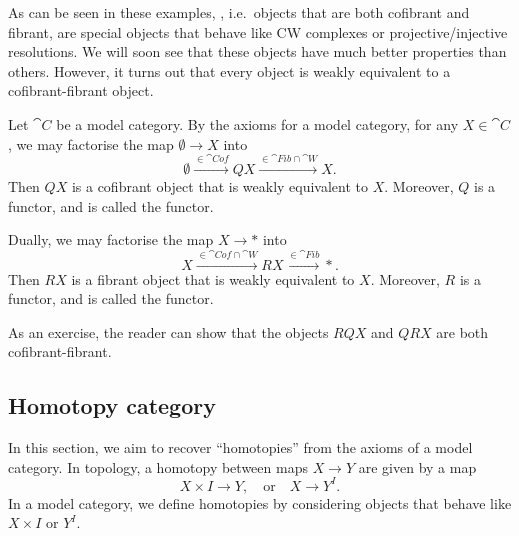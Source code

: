 As can be seen in these examples, 
, i.e.\ objects that are both cofibrant and fibrant,
are special objects that
behave like CW complexes or projective/injective resolutions.
We will soon see that these objects
have much better properties than others.
However, it turns out that every object
is weakly equivalent to a cofibrant-fibrant object.

\begin{construction}
    Let $\cat C$ be a model category.
    By the axioms for a model category,
    for any $X\in\cat C$, we may factorise the map $\emptyset\to X$ into
    \[ \emptyset\xrightarrow{\in\cat{Cof}}QX\xrightarrow{\in\cat{Fib}\cap\cat{W}}X. \]
    Then $QX$ is a cofibrant object that is weakly equivalent to $X$.
    Moreover, $Q$ is a functor, and is called the  functor.

    Dually, we may factorise the map $X\to *$ into
    \[ X\xrightarrow{\in\cat{Cof\cap\cat W}}RX\xrightarrow{\in\cat{Fib}}*. \]
    Then $RX$ is a fibrant object that is weakly equivalent to $X$.
    Moreover, $R$ is a functor, and is called the  functor.

    As an exercise,
    the reader can show that the objects $RQX$ and $QRX$ are both cofibrant-fibrant. \varqed
\end{construction}

\subsection{Homotopy category}

In this section, we aim to recover ``homotopies'' from the axioms of a model category.
In topology, a homotopy between maps $X\to Y$ are given by a map
\[ X\times I\to Y,\quad\text{or}\quad X\to Y^I. \]
In a model category, we define homotopies
by considering objects that behave like $X\times I$ or $Y^I$.

